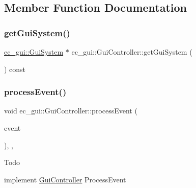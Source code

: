 \subsection{Member Function Documentation}
\mbox{\label{classec__gui_1_1_gui_controller_ac622f414d602de0d4643e35bfa5f49ac}} 
\subsubsection{\texorpdfstring{get\+Gui\+System()}{getGuiSystem()}}
{\footnotesize\ttfamily \mbox{\hyperlink{classec__gui_1_1_gui_system}{ec\+\_\+gui\+::\+Gui\+System}} $\ast$ ec\+\_\+gui\+::\+Gui\+Controller\+::get\+Gui\+System (\begin{DoxyParamCaption}{ }\end{DoxyParamCaption}) const}

\mbox{\label{classec__gui_1_1_gui_controller_a3435c1c74eff0dc75c27142d0d86b4c5}} 
\subsubsection{\texorpdfstring{process\+Event()}{processEvent()}}
{\footnotesize\ttfamily void ec\+\_\+gui\+::\+Gui\+Controller\+::process\+Event (\begin{DoxyParamCaption}\item[{const \mbox{\hyperlink{structec_1_1_input_event}{ec\+::\+Input\+Event}} \&}]{event }\end{DoxyParamCaption})\hspace{0.3cm}{\ttfamily [override]}, {\ttfamily [protected]}, {\ttfamily [virtual]}}

\begin{DoxyRefDesc}{Todo}
\item[\mbox{\hyperlink{todo__todo000009}{Todo}}]implement \mbox{\hyperlink{classec__gui_1_1_gui_controller}{Gui\+Controller}} Process\+Event \end{DoxyRefDesc}


